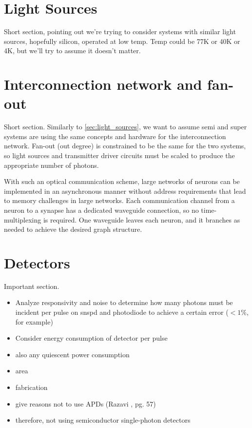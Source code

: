\documentclass[twocolumn]{article}
\begin{document}
\section{\label{sec:light_sources}Light Sources}
Short section, pointing out we're trying to consider systems with similar light sources, hopefully silicon, operated at low temp. Temp could be 77K or 40K or 4K, but we'll try to assume it doesn't matter. 
	
\section{\label{sec:interconnection}Interconnection network and fan-out}
Short section. Similarly to \ref{sec:light_sources}, we want to assume semi and super systems are using the same concepts and hardware for the interconnection network. Fan-out (out degree) is constrained to be the same for the two systems, so light sources and transmitter driver circuits must be scaled to produce the appropriate number of photons.

With such an optical communication scheme, large networks of neurons can be implemented in an asynchronous manner without address requirements that lead to memory challenges in large networks. Each communication channel from a neuron to a synapse has a dedicated waveguide connection, so no time-multiplexing is required. One waveguide leaves each neuron, and it branches as needed to achieve the desired graph structure.

\section{\label{sec:detectors}Detectors}
Important section. 
\begin{itemize}
\item Analyze responsivity and noise to determine how many photons must be incident per pulse on snspd and photodiode to achieve a certain error ($<1\%$, for example)
\item Consider energy consumption of detector per pulse
\item also any quiescent power consumption
\item area
\item fabrication
\item give reasons not to use APDs (Razavi \cite{ra2012}, pg. 57)
\item therefore, not using semiconductor single-photon detectors
\end{itemize}
\end{document}

